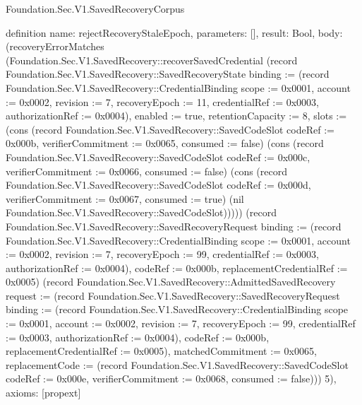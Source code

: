 \begin{lexlean}{Foundation.Sec.V1.SavedRecoveryCorpus}
\begin{semanticmodule}
definition{
  name: rejectRecoveryStaleEpoch,
  parameters: [],
  result: Bool,
  body: (recoveryErrorMatches (Foundation.Sec.V1.SavedRecovery::recoverSavedCredential (record Foundation.Sec.V1.SavedRecovery::SavedRecoveryState {binding := (record Foundation.Sec.V1.SavedRecovery::CredentialBinding {scope := 0x0001, account := 0x0002, revision := 7, recoveryEpoch := 11, credentialRef := 0x0003, authorizationRef := 0x0004}), enabled := true, retentionCapacity := 8, slots := (cons (record Foundation.Sec.V1.SavedRecovery::SavedCodeSlot {codeRef := 0x000b, verifierCommitment := 0x0065, consumed := false}) (cons (record Foundation.Sec.V1.SavedRecovery::SavedCodeSlot {codeRef := 0x000c, verifierCommitment := 0x0066, consumed := false}) (cons (record Foundation.Sec.V1.SavedRecovery::SavedCodeSlot {codeRef := 0x000d, verifierCommitment := 0x0067, consumed := true}) (nil Foundation.Sec.V1.SavedRecovery::SavedCodeSlot))))}) (record Foundation.Sec.V1.SavedRecovery::SavedRecoveryRequest {binding := (record Foundation.Sec.V1.SavedRecovery::CredentialBinding {scope := 0x0001, account := 0x0002, revision := 7, recoveryEpoch := 99, credentialRef := 0x0003, authorizationRef := 0x0004}), codeRef := 0x000b, replacementCredentialRef := 0x0005}) (record Foundation.Sec.V1.SavedRecovery::AdmittedSavedRecovery {request := (record Foundation.Sec.V1.SavedRecovery::SavedRecoveryRequest {binding := (record Foundation.Sec.V1.SavedRecovery::CredentialBinding {scope := 0x0001, account := 0x0002, revision := 7, recoveryEpoch := 99, credentialRef := 0x0003, authorizationRef := 0x0004}), codeRef := 0x000b, replacementCredentialRef := 0x0005}), matchedCommitment := 0x0065, replacementCode := (record Foundation.Sec.V1.SavedRecovery::SavedCodeSlot {codeRef := 0x000e, verifierCommitment := 0x0068, consumed := false})})) 5),
  axioms: [propext]
}


\end{semanticmodule}
\end{lexlean}
